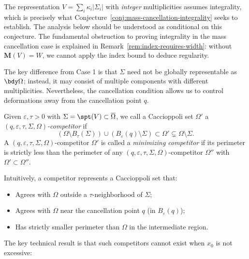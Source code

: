 \begin{remark}

The representation $V = \sum_i\kappa_i|\Sigma_i|$ with \emph{integer} multiplicities assumes integrality, which is precisely what Conjecture~\ref{conj:mass-cancellation-integrality} seeks to establish. The analysis below should be understood as conditional on this conjecture. The fundamental obstruction to proving integrality in the mass cancellation case is explained in Remark~\ref{rem:index-requires-width}: without $\mathbf{M}(V) = W$, we cannot apply the index bound to deduce regularity.
\end{remark}

The key difference from Case 1 is that $\Sigma$ need not be globally representable as $\bdy\Omega$; instead,
it may consist of multiple components with different multiplicities. Nevertheless, the cancellation condition
allows us to control deformations away from the cancellation point $q$.

\begin{definition}\label{def:competitor}
Given $\varepsilon, \tau > 0$ with $\Sigma = \spt(V) \subset \overline{\Omega}$, we call a Caccioppoli set
$\Omega'$ a \emph{$(q, \varepsilon, \tau, \Sigma, \Omega)$-competitor} if
\[
    (\Omega \setminus B_\tau(\Sigma)) \cup (B_\varepsilon(q) \setminus \Sigma) \subset \Omega' \subsetneq \Omega \setminus \Sigma.
\]
A $(q, \varepsilon, \tau, \Sigma, \Omega)$-competitor $\Omega'$ is called a \emph{minimizing competitor}
if its perimeter is strictly less than the perimeter of any $(q, \varepsilon, \tau, \Sigma, \Omega)$-competitor
$\Omega''$ with $\Omega' \subset \Omega''$.
\end{definition}

Intuitively, a competitor represents a Caccioppoli set that:
\begin{itemize}
    \item Agrees with $\Omega$ outside a $\tau$-neighborhood of $\Sigma$;
    \item Agrees with $\Omega$ near the cancellation point $q$ (in $B_\varepsilon(q)$);
    \item Has strictly smaller perimeter than $\Omega$ in the intermediate region.
\end{itemize}

The key technical result is that such competitors cannot exist when $x_0$ is not excessive:


